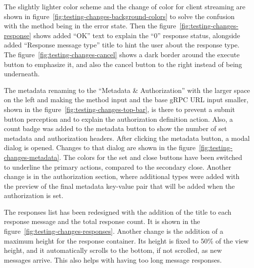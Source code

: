 The slightly lighter color scheme and the change of color for client streaming are shown in figure~\ref{fig:testing-changes-background-colors} to solve the confusion with the method being in the error state.
Then the figure~\ref{fig:testing-changes-response} shows added \enquote{OK} text to explain the \enquote{0} response status, alongside added \enquote{Response message type} title to hint the user about the response type.
The figure~\ref{fig:testing-changes-cancel} shows a dark border around the execute button to emphasize it, and also the cancel button to the right instead of being underneath.

The metadata renaming to the \enquote{Metadata \& Authorization} with the larger space on the left and making the method input and the base gRPC URL input smaller, shown in the figure~\ref{fig:testing-changes-top-bar}, is there to prevent a submit button perception and to explain the authorization definition action.
Also, a count badge was added to the metadata button to show the number of set metadata and authorization headers.
After clicking the metadata button, a modal dialog is opened.
Changes to that dialog are shown in the figure~\ref{fig:testing-changes-metadata}.
The colors for the set and close buttons have been switched to underline the primary actions, compared to the secondary close.
Another change is in the authorization section, where additional types were added with the preview of the final metadata key-value pair that will be added when the authorization is set.

The responses list has been redesigned with the addition of the title to each response message and the total response count.
It is shown in the figure~\ref{fig:testing-changes-responses}.
Another change is the addition of a maximum height for the response container.
Its height is fixed to 50\% of the view height, and it automatically scrolls to the bottom, if not scrolled, as new messages arrive.
This also helps with having too long message responses.


\newpage

